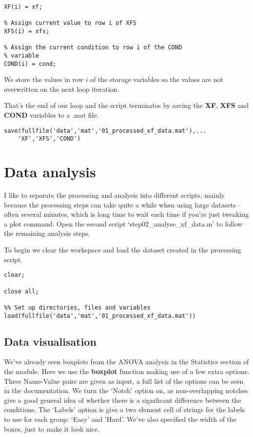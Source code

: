 \documentclass[12pt,a4paper]{article}
\begin{document}
\begin{lstlisting}[style=Matlab-editor]
% Assign current value to row i of XF
XF(i) = xf;
    
% Assign current value to row i of XFS
XFS(i) = xfs;

% Assign the current condition to row i of the COND 
% variable
COND(i) = cond;
\end{lstlisting}
We store the values in row $i$ of the storage variables so the values are not overwritten on the next loop iteration.

That's the end of our loop and the script terminates by saving the \textbf{XF}, \textbf{XFS} and \textbf{COND} variables to a .mat file.

\begin{lstlisting}[style=Matlab-editor]
%% Save data to file 
save(fullfile('data','mat','01_processed_xf_data.mat'),...
    'XF','XFS','COND')
\end{lstlisting}

\section{Data analysis}
I like to separate the processing and analysis into different scripts, mainly because the processing steps can take quite a while when using large datasets – often several minutes, which is long time to wait each time if you're just tweaking a plot command. Open the second script `step02\_analyse\_xf\_data.m' to follow the remaining analysis steps.

To begin we clear the workspace and load the dataset created in the processing script.

\begin{lstlisting}[style=Matlab-editor]
% Clear workspace and close open figures
clear; 

close all;

%% Set up directories, files and variables
load(fullfile('data','mat','01_processed_xf_data.mat'))
\end{lstlisting}

\subsection{Data visualisation}
We've already seen boxplots from the ANOVA analysis in the Statistics section of the module.
Here we use the \textbf{boxplot} function making use of a few extra options.
Three Name-Value pairs are given as input, a full list of the options can be seen in the documentation.
We turn the `Notch' option on, as non-overlapping notches give a good general idea of whether there is a significant difference between the conditions.
The `Labels' option is give a two element cell of strings for the labels to use for each group: `Easy' and 'Hard'.
We've also specified the width of the boxes, just to make it look nice.
\end{document}
